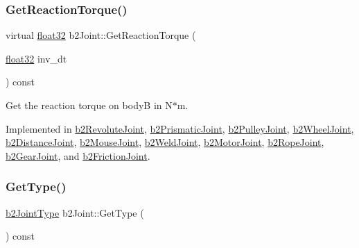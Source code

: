 \mbox{\label{classb2_joint_ae355e441c2aa842777dc04e24f15ced0}} 
\subsubsection{\texorpdfstring{GetReactionTorque()}{GetReactionTorque()}}
{\footnotesize\ttfamily virtual \mbox{\hyperlink{b2_settings_8h_aacdc525d6f7bddb3ae95d5c311bd06a1}{float32}} b2\+Joint\+::\+Get\+Reaction\+Torque (\begin{DoxyParamCaption}\item[{\mbox{\hyperlink{b2_settings_8h_aacdc525d6f7bddb3ae95d5c311bd06a1}{float32}}}]{inv\+\_\+dt }\end{DoxyParamCaption}) const\hspace{0.3cm}{\ttfamily [pure virtual]}}



Get the reaction torque on bodyB in N$\ast$m. 



Implemented in \mbox{\hyperlink{classb2_revolute_joint_aab61a3f330aa93ae28f657e36bc3db51}{b2\+Revolute\+Joint}}, \mbox{\hyperlink{classb2_prismatic_joint_a009526663c2ad848084103470375dc67}{b2\+Prismatic\+Joint}}, \mbox{\hyperlink{classb2_pulley_joint_a707bed4e4541d5da58022a6ee2bc58a1}{b2\+Pulley\+Joint}}, \mbox{\hyperlink{classb2_wheel_joint_ad3317bb9856b105e4cb34d067316d7a8}{b2\+Wheel\+Joint}}, \mbox{\hyperlink{classb2_distance_joint_ad7ac78c4c20c122b944947d523a02982}{b2\+Distance\+Joint}}, \mbox{\hyperlink{classb2_mouse_joint_aa9ea0d1b1aa2db5be3ed63392a7e28a2}{b2\+Mouse\+Joint}}, \mbox{\hyperlink{classb2_weld_joint_aa591fa3cb8238eefa2b39cb7422ff07c}{b2\+Weld\+Joint}}, \mbox{\hyperlink{classb2_motor_joint_a542b68309e0294f8bda152eff92086d9}{b2\+Motor\+Joint}}, \mbox{\hyperlink{classb2_rope_joint_ab3d2e29e34ab2fc6a2e23c055d865c18}{b2\+Rope\+Joint}}, \mbox{\hyperlink{classb2_gear_joint_a6c0f2f34c087085202b1a9506cd48fd1}{b2\+Gear\+Joint}}, and \mbox{\hyperlink{classb2_friction_joint_a0a51dfa3bbc85408b9ccd63664230c99}{b2\+Friction\+Joint}}.

\mbox{\label{classb2_joint_ac56eef62fe1ac7c9e5e21a79fb035255}} 
\subsubsection{\texorpdfstring{GetType()}{GetType()}}
{\footnotesize\ttfamily \mbox{\hyperlink{b2_joint_8h_a0bb202d8a286c888a11985b07b2272ab}{b2\+Joint\+Type}} b2\+Joint\+::\+Get\+Type (\begin{DoxyParamCaption}{ }\end{DoxyParamCaption}) const\hspace{0.3cm}{\ttfamily [inline]}}



